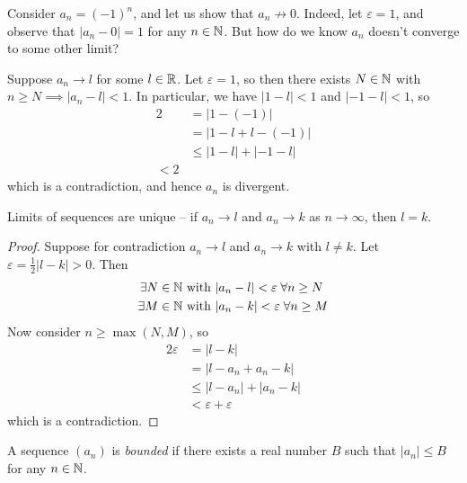 \documentclass{../template/note}
\begin{document}
    \begin{example}
        Consider \(a_n = (-1)^n\), and let us show that \(a_n \not\to 0\). Indeed, let \(\varepsilon = 1\), and observe that \(|a_n - 0| = 1\) for any \(n \in \mathbb N\). But how do we know \(a_n\) doesn't converge to some other limit?

        Suppose \(a_n \to l\) for some \(l \in \mathbb R\). Let \(\varepsilon = 1\), so then there exists \(N \in \mathbb N\) with \(n \geq N \implies |a_n - l| < 1\). In particular, we have \(|1 - l| < 1\) and \(|-1 - l| < 1\), so
        \begin{align*}
            2 &= |1 - (-1)| \\
            &= |1 - l + l - (-1)| \\
            &\leq |1-l| + |-1-l| \\
            < 2
        \end{align*}
        which is a contradiction, and hence \(a_n\) is divergent.
    \end{example}
    
    \begin{proposition}
        Limits of sequences are unique -- if \(a_n \to l\) and \(a_n \to k\) as \(n \to \infty\), then \(l=k\).
    \end{proposition}
    
    \begin{proof}
        Suppose for contradiction \(a_n \to l\) and \(a_n \to k\) with \(l \neq k\). Let \(\varepsilon = \frac{1}{2}|l-k| > 0\). Then
        \begin{align*}
            \exists N \in \mathbb N \text{ with } &|a_n - l| < \varepsilon \; \forall n \geq N \\
            \exists M \in \mathbb N \text{ with } &|a_n - k| < \varepsilon \; \forall n \geq M
        \end{align*}
        Now consider \(n \geq \max(N, M)\), so
        \begin{align*}
            2\varepsilon &= |l-k| \\
            &= |l-a_n+a_n-k| \\
            &\leq |l-a_n|+|a_n-k| \\
            &< \varepsilon + \varepsilon
        \end{align*}
        which is a contradiction.
    \end{proof}
    
    \begin{definition}
        A sequence \((a_n)\) is \emph{bounded} if there exists a real number \(B\) such that \(|a_n| \leq B\) for any \(n \in \mathbb N\).
    \end{definition}
    
\end{document}
